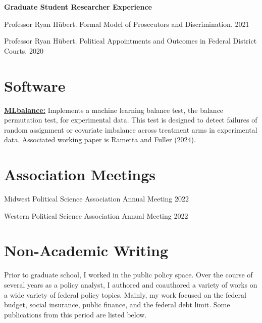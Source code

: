 \documentclass[
  11pt,
]
{article}
\renewenvironment{itemize}{
  \begin{list}{}{
    \setlength{\leftmargin}{1.5em}
  }
}{
  \end{list}
}
\begin{document}
\textbf{Graduate Student Researcher Experience}

\begin{itemize}
\item
  Professor Ryan Hübert. Formal Model of Prosecutors and Discrimination.
  2021
\item
  Professor Ryan Hübert. Political Appointments and Outcomes in Federal
  District Courts. 2020
\end{itemize}

\hypertarget{software}{%
\section{Software}\label{software}}

\href{https://github.com/CetiAlphaFive/MLbalance}{\textbf{MLbalance:}}
Implements a machine learning balance test, the balance permutation
test, for experimental data. This test is designed to detect failures of
random assignment or covariate imbalance across treatment arms in
experimental data. Associated working paper is Rametta and Fuller
(2024).

\hypertarget{association-meetings}{%
\section{Association Meetings}\label{association-meetings}}

Midwest Political Science Association Annual Meeting \hfill 2022

Western Political Science Association Annual Meeting \hfill 2022

\hypertarget{non-academic-writing}{%
\section{Non-Academic Writing}\label{non-academic-writing}}

Prior to graduate school, I worked in the public policy space. Over the
course of several years as a policy analyst, I authored and coauthored a
variety of works on a wide variety of federal policy topics. Mainly, my
work focused on the federal budget, social insurance, public finance,
and the federal debt limit. Some publications from this period are
listed below.
\end{document}

